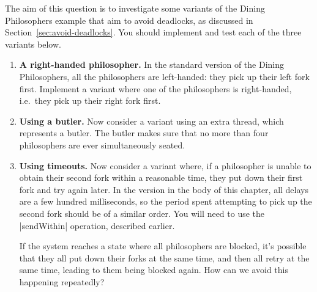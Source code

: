 \begin{question}
\label{ex:diningPhils}
The aim of this question is to investigate some variants of the Dining
Philosophers example that aim to avoid deadlocks, as discussed in
Section~\ref{sec:avoid-deadlocks}.  You should implement and test each of the
three variants below.
%
\begin{enumerate}
\item \textbf{A right-handed philosopher.}
In the standard version of the Dining Philosophers, all the philosophers are
left-handed: they pick up their left fork first.  Implement a variant where
one of the philosophers is right-handed, i.e.\ they pick up their right fork
first.

\item \textbf{Using a butler.} Now consider a variant using an extra
  thread, which represents a butler.  The butler makes sure that no more than
  four philosophers are ever simultaneously seated.

\item \textbf{Using timeouts.} Now consider a variant where, if a philosopher
  is unable to obtain their second fork within a reasonable time, they put
  down their first fork and try again later.  In the version in the body of this
  chapter, all delays are a few hundred milliseconds, so the period spent
  attempting to pick up the second fork should be of a similar order.  You
  will need to use the |sendWithin| operation, described earlier.

If the system reaches a state where all philosophers are blocked, it's
possible that they all put down their forks at the same time, and then all
retry at the same time, leading to them being blocked again.  How can we avoid
this happening repeatedly?
\end{enumerate}
\end{question}


